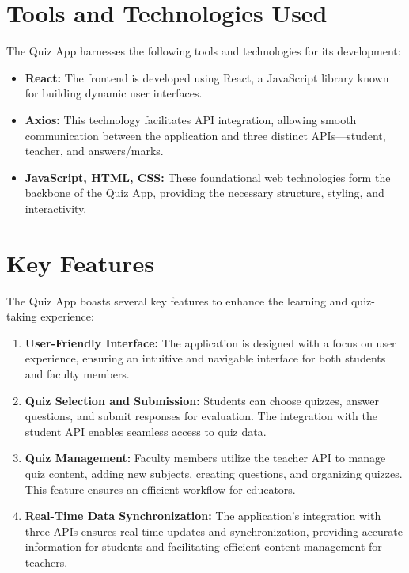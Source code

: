 \section{Tools and Technologies Used}
The Quiz App harnesses the following tools and technologies for its development:

\begin{itemize}
    \item \textbf{React:} The frontend is developed using React, a JavaScript library known for building dynamic user interfaces.

    \item \textbf{Axios:} This technology facilitates API integration, allowing smooth communication between the application and three distinct APIs—student, teacher, and answers/marks.

    \item \textbf{JavaScript, HTML, CSS:} These foundational web technologies form the backbone of the Quiz App, providing the necessary structure, styling, and interactivity.

\end{itemize}

\section{Key Features}
The Quiz App boasts several key features to enhance the learning and quiz-taking experience:

\begin{enumerate}
    \item \textbf{User-Friendly Interface:} The application is designed with a focus on user experience, ensuring an intuitive and navigable interface for both students and faculty members.

    \item \textbf{Quiz Selection and Submission:} Students can choose quizzes, answer questions, and submit responses for evaluation. The integration with the student API enables seamless access to quiz data.

    \item \textbf{Quiz Management:} Faculty members utilize the teacher API to manage quiz content, adding new subjects, creating questions, and organizing quizzes. This feature ensures an efficient workflow for educators.

    \item \textbf{Real-Time Data Synchronization:} The application's integration with three APIs ensures real-time updates and synchronization, providing accurate information for students and facilitating efficient content management for teachers.

\end{enumerate}


